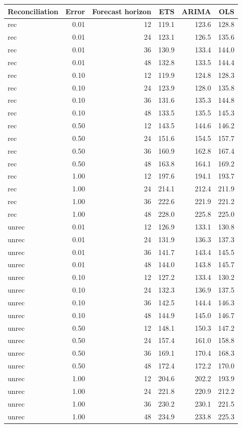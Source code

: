 \documentclass[11pt,a4paper,]{article}
\let\origtable\table
\let\endorigtable\endtable
\renewenvironment{table}[1][2] {
    \expandafter\origtable\expandafter[!htbp]
} {
    \endorigtable
}
\begin{document}
\begin{table}[!h]

\caption{\label{tab:TourismdatasimfixnoiseFH}Mean(RMSE) on one to four year test set with different error levels for ETS, ARIMA and OLS with and without reconciliation - Fixed origin - 304 bottom level series and 8 levels of hierarchy - Simulated tourism dataset}
\centering
\begin{tabular}[t]{lrrrrr}
\toprule
Reconciliation & Error & Forecast horizon & ETS & ARIMA & OLS\\
\midrule
rec & 0.01 & 12 & 119.1 & 123.6 & 128.8\\
rec & 0.01 & 24 & 123.1 & 126.5 & 135.6\\
rec & 0.01 & 36 & 130.9 & 133.4 & 144.0\\
rec & 0.01 & 48 & 132.8 & 133.5 & 144.4\\
rec & 0.10 & 12 & 119.9 & 124.8 & 128.3\\
rec & 0.10 & 24 & 123.9 & 128.0 & 135.8\\
rec & 0.10 & 36 & 131.6 & 135.3 & 144.8\\
rec & 0.10 & 48 & 133.5 & 135.5 & 145.3\\
rec & 0.50 & 12 & 143.5 & 144.6 & 146.2\\
rec & 0.50 & 24 & 151.6 & 154.5 & 157.7\\
rec & 0.50 & 36 & 160.9 & 162.8 & 167.4\\
rec & 0.50 & 48 & 163.8 & 164.1 & 169.2\\
rec & 1.00 & 12 & 197.6 & 194.1 & 193.7\\
rec & 1.00 & 24 & 214.1 & 212.4 & 211.9\\
rec & 1.00 & 36 & 222.6 & 221.9 & 221.2\\
rec & 1.00 & 48 & 228.0 & 225.8 & 225.0\\
unrec & 0.01 & 12 & 126.9 & 133.1 & 130.8\\
unrec & 0.01 & 24 & 131.9 & 136.3 & 137.3\\
unrec & 0.01 & 36 & 141.7 & 143.4 & 145.5\\
unrec & 0.01 & 48 & 144.0 & 143.8 & 145.7\\
unrec & 0.10 & 12 & 127.2 & 133.4 & 130.2\\
unrec & 0.10 & 24 & 132.3 & 136.9 & 137.5\\
unrec & 0.10 & 36 & 142.5 & 144.4 & 146.3\\
unrec & 0.10 & 48 & 144.9 & 145.0 & 146.7\\
unrec & 0.50 & 12 & 148.1 & 150.3 & 147.2\\
unrec & 0.50 & 24 & 157.4 & 161.0 & 158.8\\
unrec & 0.50 & 36 & 169.1 & 170.4 & 168.3\\
unrec & 0.50 & 48 & 172.4 & 172.2 & 170.0\\
unrec & 1.00 & 12 & 204.6 & 202.2 & 193.9\\
unrec & 1.00 & 24 & 221.8 & 220.9 & 212.2\\
unrec & 1.00 & 36 & 230.2 & 230.1 & 221.5\\
unrec & 1.00 & 48 & 234.9 & 233.8 & 225.3\\
\bottomrule
\end{tabular}
\end{table}
\end{document}
